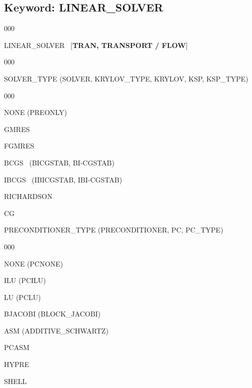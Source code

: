 \documentclass[12pt]{article}
\begin{document}

\newpage
\protect\hypertarget{target_linsolv}{}

\subsection{Keyword: LINEAR\_SOLVER}


\begin{deflist}{000}
\item[LINEAR\_SOLVER] \ [{\bf TRAN, TRANSPORT / FLOW}]

\begin{deflist}{000}
\item[SOLVER\_TYPE (SOLVER, KRYLOV\_TYPE, KRYLOV, KSP, KSP\_TYPE)] ~

\begin{deflist}{000}
\item[NONE (PREONLY)]
\item[GMRES]
\item[FGMRES]
\item[BCGS] \ (BICGSTAB, BI-CGSTAB)
\item[IBCGS] \ (IBICGSTAB, IBI-CGSTAB)
\item[RICHARDSON]
\item[CG]
\end{deflist}

\item[PRECONDITIONER\_TYPE (PRECONDITIONER, PC, PC\_TYPE)] ~

\begin{deflist}{000}
\item[NONE (PCNONE)]
\item[ILU (PCILU)]
\item[LU (PCLU)]
\item[BJACOBI (BLOCK\_JACOBI)]
\item[ASM (ADDITIVE\_SCHWARTZ)]
\item[PCASM]
\item[HYPRE]
\item[SHELL]
\end{deflist}


\end{deflist}
\end{deflist}
\end{document}
